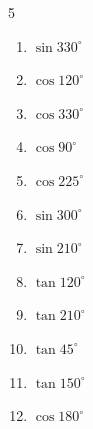 \begin{multicols}{5}
\begin{enumerate}
  \item $\displaystyle \sin{330^\circ}$


\columnbreak %

\resetques

  \item $\displaystyle \cos{120^\circ}$


  \item $\displaystyle \cos{330^\circ}$


  \item $\displaystyle \cos{90^\circ}$

        \phantom{$\displaystyle =0$}

  \item $\displaystyle \cos{225^\circ}$


  \item $\displaystyle \sin{300^\circ}$


  \item $\displaystyle \sin{210^\circ}$


  \item $\displaystyle \tan{120^\circ}$


  \item $\displaystyle \tan{210^\circ}$


  \item $\displaystyle \tan{45^\circ}$

        \phantom{$\displaystyle =1$}

  \item $\displaystyle \tan{150^\circ}$


  \item $\displaystyle \cos{180^\circ}$

        \phantom{$\displaystyle =-1$}


\end{enumerate}
\end{multicols}
